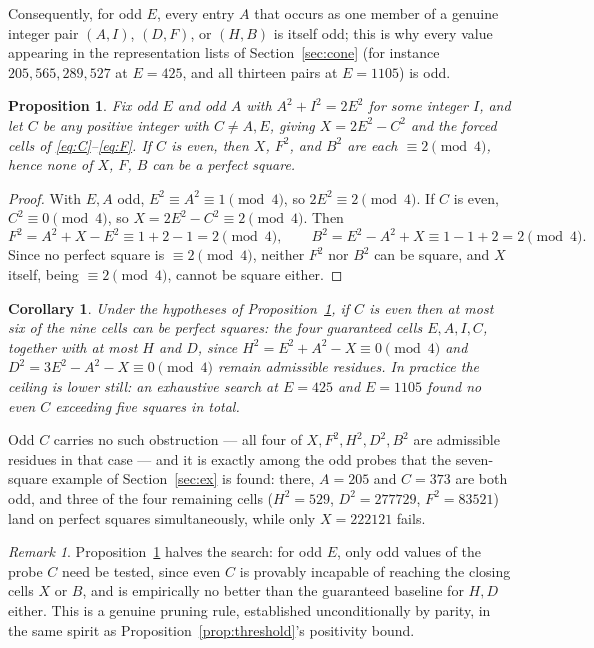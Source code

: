 \documentclass[12pt]{article}
\newtheorem{proposition}[theorem]{Proposition}
\newtheorem{corollary}[theorem]{Corollary}
\theoremstyle{remark}
\newtheorem{remark}[theorem]{Remark}
\begin{document}
Consequently, for odd $E$, every entry $A$ that occurs as one member of
a genuine integer pair $(A,I)$, $(D,F)$, or $(H,B)$ is itself odd; this
is why every value appearing in the representation lists of
Section~\ref{sec:cone} (for instance $205,565,289,527$ at $E=425$, and
all thirteen pairs at $E=1105$) is odd.

\begin{proposition}\label{prop:parity}
Fix odd $E$ and odd $A$ with $A^2+I^2=2E^2$ for some integer $I$, and
let $C$ be any positive integer with $C \ne A, E$, giving
$X = 2E^2-C^2$ and the forced cells of
\eqref{eq:C}--\eqref{eq:F}. If $C$ is even, then $X$, $F^2$, and $B^2$
are each $\equiv 2 \pmod4$, hence none of $X$, $F$, $B$ can be a perfect
square.
\end{proposition}

\begin{proof}
With $E,A$ odd, $E^2\equiv A^2\equiv1\pmod4$, so $2E^2\equiv2\pmod4$.
If $C$ is even, $C^2\equiv0\pmod4$, so
$X = 2E^2-C^2 \equiv 2 \pmod4$. Then
\[
F^2 = A^2+X-E^2 \equiv 1+2-1 = 2 \pmod4, \qquad
B^2 = E^2-A^2+X \equiv 1-1+2 = 2 \pmod4 .
\]
Since no perfect square is $\equiv2\pmod4$, neither $F^2$ nor $B^2$ can
be square, and $X$ itself, being $\equiv2\pmod4$, cannot be square
either.
\end{proof}

\begin{corollary}\label{cor:parity5}
Under the hypotheses of Proposition~\ref{prop:parity}, if $C$ is even
then at most six of the nine cells can be perfect squares: the four
guaranteed cells $E,A,I,C$, together with at most $H$ and $D$, since
$H^2 = E^2+A^2-X \equiv0\pmod4$ and
$D^2 = 3E^2-A^2-X\equiv0\pmod4$ remain admissible residues. In
practice the ceiling is lower still: an exhaustive search at $E=425$
and $E=1105$ found no even $C$ exceeding five squares in total.
\end{corollary}

Odd $C$ carries no such obstruction --- all four of $X,F^2,H^2,D^2,B^2$
are admissible residues in that case --- and it is exactly among the
odd probes that the seven-square example of Section~\ref{sec:ex} is
found: there, $A=205$ and $C=373$ are both odd, and three of the four
remaining cells ($H^2=529$, $D^2=277729$, $F^2=83521$) land on perfect
squares simultaneously, while only $X=222121$ fails.

\begin{remark}
Proposition~\ref{prop:parity} halves the search: for odd $E$, only odd
values of the probe $C$ need be tested, since even $C$ is provably
incapable of reaching the closing cells $X$ or $B$, and is empirically
no better than the guaranteed baseline for $H,D$ either. This is a
genuine pruning rule, established unconditionally by parity, in the
same spirit as Proposition~\ref{prop:threshold}'s positivity bound.
\end{remark}
\end{document}
